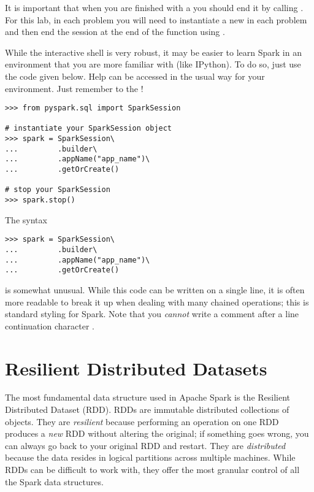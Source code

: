 \begin{warn}
It is important that when you are finished with a  you should end it by calling . For this lab, in each problem you will need to instantiate a new  in each problem and then end the session at the end of the function using .
\end{warn}

\begin{info}
While the interactive shell is very robust, it may be easier to learn Spark in an environment that you are more familiar with (like IPython). 
To do so, just use the code given below. Help can be accessed in the usual way for your environment. 
Just remember to  the !
\end{info}

\begin{lstlisting}
>>> from pyspark.sql import SparkSession

# instantiate your SparkSession object
>>> spark = SparkSession\
...			.builder\
...			.appName("app_name")\
...			.getOrCreate()

# stop your SparkSession
>>> spark.stop()
\end{lstlisting}

\begin{info}
The syntax
\begin{lstlisting}
>>> spark = SparkSession\
...			.builder\
...			.appName("app_name")\
...			.getOrCreate()
\end{lstlisting}
is somewhat unusual. 
While this code can be written on a single line, it is often more readable to break it up when dealing with many chained operations; this is standard styling for Spark. 
Note that you \textit{cannot} write a comment after a line continuation character .
\end{info}


\section*{Resilient Distributed Datasets} %
The most fundamental data structure used in Apache Spark is the Resilient Distributed Dataset (RDD).
RDDs are immutable distributed collections of objects.
They are \textit{resilient} because performing an operation on one RDD produces a \textit{new} RDD without altering the original; if something goes wrong, you can always go back to your original RDD and restart.
They are \textit{distributed} because the data resides in logical partitions across multiple machines.
While RDDs can be difficult to work with, they offer the most granular control of all the Spark data structures.

